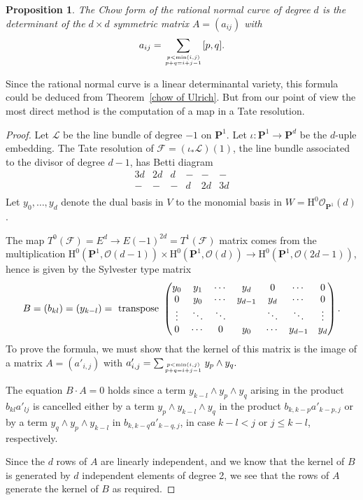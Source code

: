 \documentclass{jams-l}
\newtheorem{proposition}[theorem]{Proposition}
\theoremstyle{definition}
\theoremstyle{remark}
\newcommand{\F}{{\mathcal F}}
\newcommand{\Hrm}{{\mathrm H}}
\newcommand{\cL}{{\mathcal L}}
\newcommand{\Lcal}{{\mathcal L}}
\newcommand{\Ocal}{{\mathcal O}}
\newcommand{\cO}{{\mathcal O}}
\newcommand{\PP}{{\mathbf P}}
\begin{document}
\begin{proposition}\label{P1}
The Chow form of the rational normal curve of degree $d$
is the determinant of the $d \times d$ symmetric matrix
$A=(a_{ij})$ with
\[
a_{ij} = \sum_{p < \min(i,j) \atop p+q=i+j-1} [p,q].
\]
\end{proposition}

Since
the rational normal curve is a linear determinantal variety,
this formula could be deduced from
Theorem~\ref{chow of Ulrich}. But  from our point of view the most direct 
method is the  computation of a map 
in a Tate resolution.

\begin{proof} Let $\Lcal$ be the line bundle of
degree $-1$ on $\PP^1$.
Let $\iota: \PP^1 \to \PP^d$ be
the $d$-uple embedding. 
The Tate
resolution of $\F=(\iota_*\cL)(1)$, the line
bundle associated to the divisor of degree $d-1$,
has Betti diagram
\[
\begin{matrix} 3d & 2d & d & - & - & - \\
          - &  - & - & d & 2d & 3d \\ \end{matrix}
\]
Let $y_0,\ldots,y_d$ denote the dual basis
in $V$ to the monomial basis in $W=\Hrm^0\Ocal_{\PP^1}(d)$.

The map $T^0(\F)=E^d\to E(-1)^{2d}= T^1(\F)$ matrix comes from the
multiplication $\Hrm^0(\PP^1,\cO(d-1))\times \Hrm^0(\PP^1,\cO(d)) \to
\Hrm^0(\PP^1,\cO(2d-1))$, hence is given by the Sylvester type matrix
\[
B=(b_{kl})=(y_{k-l})=\hbox{ transpose }\begin{pmatrix} y_0 & y_1 & \ldots  & y_d & 0 & \ldots & 0 \\
          0 & y_0 & \ldots & y_{d-1} & y_d &\ldots & 0 \\
          \vdots&\ddots&\ddots& &\ddots &\ddots &\vdots \\
          0 & \ldots & 0 & y_0 & \ldots & y_{d-1} & y_d \\ \end{pmatrix}.
\]
To prove the formula, we must show that the kernel of this matrix is the image
of a matrix $A=(a'_{i,j})$ with
$a'_{i,j}=\sum_{p < \min(i,j) \atop p+q=i+j-1} y_p\wedge y_q.$

The equation $B\cdot A=0$ holds since a 
term $y_{k-l} \wedge y_p \wedge y_q $ arising in the product
$b_{kl}a'_{lj}$ is cancelled either by a term $y_p \wedge y_{k-l} \wedge y_q$
in the product $b_{k,k-p}a'_{k-p,j}$ or by a term $y_{q} \wedge y_{p}
\wedge y_{k-l}$ in $b_{k,k-q}a'_{k-q,j}$, in case $k-l < j$ or $j \le k-l$,
respectively. 

Since the $d$ rows of $A$
are linearly independent, and we know that the kernel of $B$ is
 generated by $d$ independent elements of degree 2, we see that
the rows of $A$ generate the kernel of $B$ as required.
\end{proof}
\end{document}

